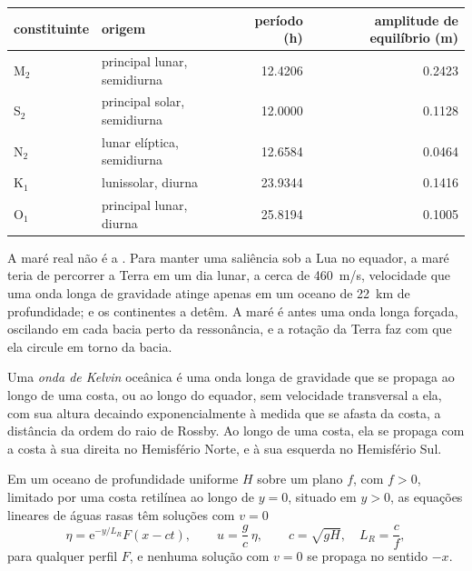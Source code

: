 \begin{center}
\small
\begin{tabular}{llrr}
\hline
constituinte & origem & período (\unit{h}) & amplitude de equilíbrio (\unit{m}) \\
\hline
M$_2$ & principal lunar, semidiurna & \num{12.4206} & \num{0.2423} \\
S$_2$ & principal solar, semidiurna & \num{12.0000} & \num{0.1128} \\
N$_2$ & lunar elíptica, semidiurna & \num{12.6584} & \num{0.0464} \\
K$_1$ & lunissolar, diurna & \num{23.9344} & \num{0.1416} \\
O$_1$ & principal lunar, diurna & \num{25.8194} & \num{0.1005} \\
\hline
\end{tabular}
\end{center}

A maré real não é a . Para manter uma saliência sob a Lua
no equador, a maré teria de percorrer a Terra em um dia lunar,
a cerca de \qty{460}{m/s}, velocidade que uma onda longa de gravidade atinge apenas
em um oceano de \qty{22}{km} de profundidade; e os continentes a detêm. A maré é
antes uma onda longa forçada, oscilando em cada bacia perto da ressonância, e a
rotação da Terra faz com que ela circule em torno da bacia.

\begin{definition}\label{def:b3:ocean-dynamics:kelvin-wave}
Uma \emph{onda de Kelvin} oceânica é uma onda longa de gravidade
que se propaga ao longo de uma costa, ou ao longo do equador, sem velocidade
transversal a ela, com sua altura decaindo exponencialmente à medida que se afasta da costa, a
distância da ordem do raio de Rossby. Ao longo de uma costa, ela se propaga com a costa à
sua direita no Hemisfério Norte, e à sua esquerda no Hemisfério Sul.
\end{definition}

\begin{theorem}\label{thm:b3:ocean-dynamics:kelvin}
Em um oceano de profundidade uniforme $H$ sobre um plano $f$, com $f > 0$, limitado por uma
costa retilínea ao longo de $y = 0$, situado em $y > 0$, as equações lineares de águas rasas
têm soluções com $v = 0$
\[
\eta = \mathrm e^{-y/L_R}F(x - ct),\qquad u = \frac{g}{c}\,\eta,\qquad
c = \sqrt{gH},\quad L_R = \frac{c}{f},
\]
para qualquer perfil $F$, e nenhuma solução com $v = 0$ se propaga no sentido
$-x$.
\end{theorem}

